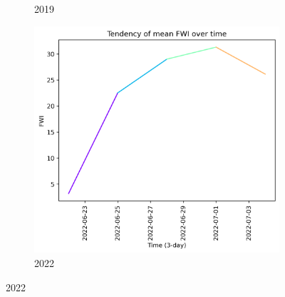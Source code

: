 \begin{figure}[h]
\begin{subfigure}{0.3\textwidth}
        \caption{2019}
        \label{fig:prior_15_days_2019}
    \end{subfigure}
    \hfill
    \begin{subfigure}{0.3\textwidth}
        \centering
        \includegraphics[width=\textwidth]{graphs/2022/tendency/2022_tendency_graph_FWI.png}
        \caption{2022}
        \label{fig:prior_15_days_2022}
    \end{subfigure}
    
    \label{fig:fwi_values_15days_prior}
\end{figure}

